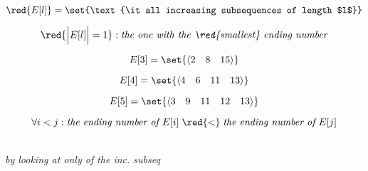 \begin{frame}{}
  \[
    \red{E[l]} = \set{\text{\it all increasing subsequences of length $l$}}
  \]

  \[
    \red{\Big|E[l]\Big| = 1}: \text{\it the one with the \red{\it smallest} ending number}
  \]

  \pause
  \[
    E[3] = \set{\langle 2\quad 8\quad 15 \rangle}
  \]
  
  \[
    E[4] = \set{\langle 4\quad 6\quad 11\quad 13 \rangle}
  \]

  \[
    E[5] = \set{\langle 3\quad 9\quad 11\quad 12\quad 13 \rangle}
  \]

  \pause
  \[
    \forall i < j: \text{\it the ending number of } E[i] \;\red{<}\; \text{\it the ending number of } E[j]
  \]
\end{frame}

\begin{frame}{}
  
\end{frame}

\begin{frame}{}
  \begin{center}
    {\Large \it {}} \\[6pt] \pause
    {\large \it by looking at only  of the inc. subseq}
  \end{center}

  \pause
  
\end{frame}

%   



